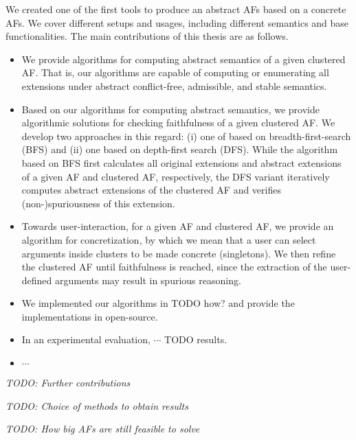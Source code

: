 We created one of the first tools \cite{Pasero2024-AFClustering-Repo} to produce an abstract AFs based on a concrete AFs. We cover different setups and usages, including different semantics and base functionalities. The main contributions of this thesis are as follows.

\begin{itemize}
    \item We provide algorithms for computing abstract semantics of a given clustered AF. That is, our algorithms are capable of computing or enumerating all extensions under abstract conflict-free, admissible, and stable semantics.

    \item Based on our algorithms for computing abstract semantics, we provide algorithmic solutions for checking faithfulness of a given clustered AF. We develop two approaches in this regard: (i) one of based on breadth-first-search (BFS) and (ii) one based on depth-first search (DFS). While the algorithm based on BFS first calculates all original extensions and abstract extensions of a given AF and clustered AF, respectively, the DFS variant iteratively computes abstract extensions of the clustered AF and verifies (non-)spuriousness of this extension.

    \item Towards user-interaction, for a given AF and clustered AF, we provide an algorithm for concretization, by which we mean that a user can select arguments inside clusters to be made concrete (singletons). We then refine the clustered AF until faithfulness is reached, since the extraction of the user-defined arguments may result in spurious reasoning.
    
    \item We implemented our algorithms in TODO how? and provide the implementations in open-source.
    \item In an experimental evaluation, $\cdots$ TODO results.
    \item $\cdots$
\end{itemize}

\noindent

\textit{TODO: Further contributions}

\textit{TODO: Choice of methods to obtain results}

\textit{TODO: How big AFs are still feasible to solve}
